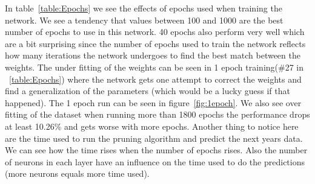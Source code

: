 \begin{table}[H]
\centering  %
\caption{The results from the dataset size test.} %
\label{table:Dataset_size} %
\end{table}

In table~\ref{table:Epochs} we see the effects of epochs used when training the network. We see a tendency that values between 100 and 1000 are the best number of epochs to use in this network. 40 epochs also perform very well which are a bit surprising since the number of epochs used to train the network reflects how many iterations the network undergoes to find the best match between the weights. The under fitting of the weights can be seen in 1 epoch training(\#27 in ~\ref{table:Epochs}) where the network gets one attempt to correct the weights and find a generalization of the parameters (which would be a lucky guess if that happened). The 1 epoch run can be seen in figure~\ref{fig:1epoch}. We also see over fitting of the dataset when running more than 1800 epochs the performance drops at least 10.26\% and gets worse with more epochs. Another thing to notice here are the time used to run the pruning algorithm and predict the next years data. We can see how the time rises when the number of epochs rises. Also the number of neurons in each layer have an influence on the time used to do the predictions (more neurons equals more time used).


